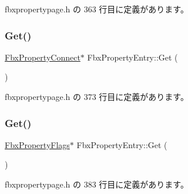  fbxpropertypage.\+h の 363 行目に定義があります。

\mbox{\label{class_fbx_property_entry_a1ed023614393f180cf621fc672b701e2}} 
\subsubsection{\texorpdfstring{Get()}{Get()}\hspace{0.1cm}{\footnotesize\ttfamily [3/4]}}
{\footnotesize\ttfamily \hyperlink{class_fbx_property_connect}{Fbx\+Property\+Connect}$\ast$ Fbx\+Property\+Entry\+::\+Get (\begin{DoxyParamCaption}\item[{const \hyperlink{class_fbx_property_connect}{Fbx\+Property\+Connect} $\ast$}]{ }\end{DoxyParamCaption})\hspace{0.3cm}{\ttfamily [inline]}}



 fbxpropertypage.\+h の 373 行目に定義があります。

\mbox{\label{class_fbx_property_entry_a674156824b96185a6603d7329a0dfd83}} 
\subsubsection{\texorpdfstring{Get()}{Get()}\hspace{0.1cm}{\footnotesize\ttfamily [4/4]}}
{\footnotesize\ttfamily \hyperlink{class_fbx_property_flags}{Fbx\+Property\+Flags}$\ast$ Fbx\+Property\+Entry\+::\+Get (\begin{DoxyParamCaption}\item[{const \hyperlink{class_fbx_property_flags}{Fbx\+Property\+Flags} $\ast$}]{ }\end{DoxyParamCaption})\hspace{0.3cm}{\ttfamily [inline]}}



 fbxpropertypage.\+h の 383 行目に定義があります。

\mbox{\label{class_fbx_property_entry_a56b169256d5fa6b43c2a054a55a34c30}} 
